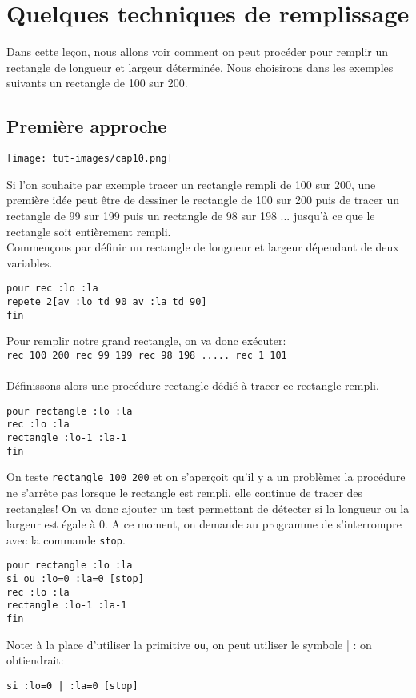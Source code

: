 \chapter{Quelques techniques de remplissage}
\noindent Dans cette leçon, nous allons voir comment on peut procéder pour remplir un rectangle de longueur et largeur déterminée. Nous choisirons dans les exemples suivants un rectangle de 100 sur 200.
\section{Première approche}
\begin{center}
\texttt{[image: tut-images/cap10.png]}
\end{center}
\noindent Si l'on souhaite par exemple tracer un rectangle rempli de 100 sur 200, une première idée peut être de dessiner le rectangle de 100 sur 200 puis de tracer un rectangle de 99 sur 199 puis un rectangle de 98 sur 198 ... jusqu'à ce que le rectangle soit entièrement rempli.  \\
Commençons par définir un rectangle de longueur et largeur dépendant de deux variables. 
\begin{verbatim}
pour rec :lo :la
repete 2[av :lo td 90 av :la td 90]
fin
\end{verbatim}
Pour remplir notre grand rectangle, on va donc exécuter:\\
\texttt{rec 100 200 rec 99 199 rec 98 198  ..... rec 1 101}\\ \\
Définissons alors une procédure rectangle dédié à tracer ce rectangle rempli.

\begin{verbatim}
pour rectangle :lo :la
rec :lo :la
rectangle :lo-1 :la-1
fin
\end{verbatim}

On teste \texttt{rectangle 100 200} et on s'aperçoit qu'il y a un problème: la procédure ne s'arrête pas lorsque le rectangle est rempli, elle continue de tracer des rectangles! On va donc ajouter un test permettant de détecter si la longueur ou la largeur est égale à 0. A ce moment, on demande au programme de s'interrompre avec la commande \texttt{stop}.
\begin{verbatim}
pour rectangle :lo :la
si ou :lo=0 :la=0 [stop]
rec :lo :la
rectangle :lo-1 :la-1
fin
\end{verbatim}
Note: à la place d'utiliser la primitive \texttt{ou}, on peut utiliser le symbole \og | \fg: on obtiendrait: \begin{center}
\texttt{si :lo=0 | :la=0 [stop]}
\end{center}
